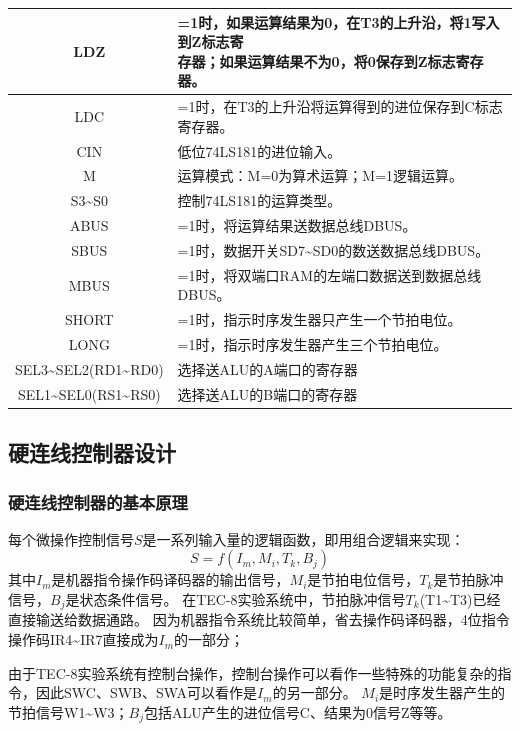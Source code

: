 \documentclass[lang=cn,11pt,a4paper,cite=authornum]{paper}
\begin{document}
\begin{table}[!htbp]
{\begin{tabular}{|c|l|}
        LDZ & \makecell[l]{=1时，如果运算结果为0，在T3的上升沿，将1写入到Z标志寄\\存器；如果运算结果不为0，将0保存到Z标志寄存器。} \\ \hline
        LDC & =1时，在T3的上升沿将运算得到的进位保存到C标志寄存器。 \\ \hline
        CIN & 低位74LS181的进位输入。 \\ \hline
        M & 运算模式：M=0为算术运算；M=1逻辑运算。 \\ \hline
        S3\textasciitilde S0 & 控制74LS181的运算类型。 \\ \hline
        ABUS & =1时，将运算结果送数据总线DBUS。 \\ \hline
        SBUS & =1时，数据开关SD7\textasciitilde SD0的数送数据总线DBUS。 \\ \hline
        MBUS & =1时，将双端口RAM的左端口数据送到数据总线DBUS。 \\ \hline
        SHORT & =1时，指示时序发生器只产生一个节拍电位。 \\ \hline
        LONG & =1时，指示时序发生器产生三个节拍电位。 \\ \hline
        SEL3\textasciitilde SEL2(RD1\textasciitilde RD0) & 选择送ALU的A端口的寄存器 \\ \hline
        SEL1\textasciitilde SEL0(RS1\textasciitilde RS0) & 选择送ALU的B端口的寄存器 \\ \hline
    \end{tabular}
    }
\end{table}

\subsection{硬连线控制器设计}

\subsubsection{硬连线控制器的基本原理}

每个微操作控制信号$S$是一系列输入量的逻辑函数，即用组合逻辑来实现：
$$
S = f(I_m, M_i, T_k, B_j)
$$
其中$I_m$是机器指令操作码译码器的输出信号，$M_i$是节拍电位信号，$T_k$是节拍脉冲信号，$B_j$是状态条件信号。
在TEC-8实验系统中，节拍脉冲信号$T_k$(T1\textasciitilde T3)已经直接输送给数据通路。
因为机器指令系统比较简单，省去操作码译码器，4位指令操作码IR4\textasciitilde IR7直接成为$I_m$的一部分；

由于TEC-8实验系统有控制台操作，控制台操作可以看作一些特殊的功能复杂的指令，因此SWC、SWB、SWA可以看作是$I_m$的另一部分。
$M_i$是时序发生器产生的节拍信号W1\textasciitilde W3；$B_j$包括ALU产生的进位信号C、结果为0信号Z等等。
\end{document}
